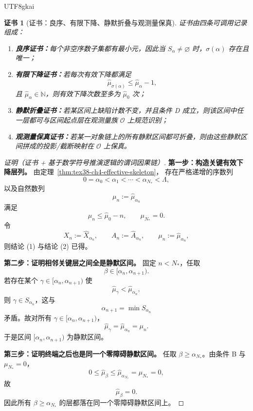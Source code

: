 \documentclass[12pt]{article}
\newtheorem{Certificate}{证书}[section]
\newcommand{\NN}{\mathbb{N}}
\begin{document}
\begin{CJK*}{UTF8}{gkai}
\begin{Certificate}[证书：良序、有限下降、静默折叠与观测量保真]
\label{cert:tex38-ch4-projection}
证书由四条可调用记录组成：
\begin{enumerate}
  \item \textbf{良序证书：}每个非空序数子集都有最小元，因此当 $S_\alpha\neq\varnothing$ 时，$\sigma(\alpha)$ 存在且唯一；
  \item \textbf{有限下降证书：}若每次有效下降都满足
  \[
    \widehat\mu_{\sigma(\alpha)}\le \widehat\mu_\alpha-1,
  \]
  且 $\widehat\mu_\alpha\in\NN$，则有效下降次数至多为 $\widehat\mu_0$ 次；
  \item \textbf{静默折叠证书：}若某区间上缺陷计数不变，并且条件 D 成立，则该区间中任一层都可与区间起点层在观测量族 $\mathcal O$ 上规范识别；
  \item \textbf{观测量保真证书：}若某一对象链上的所有静默区间都可折叠，则由这些静默区间拼成的投影/截断映射在 $\mathcal O$ 上保真。
\end{enumerate}
\end{Certificate}

\begin{proof}[证明（证书 + 基于数学符号推演逻辑的谓词因果链）]
\textbf{第一步：构造关键有效下降层列。}
由定理~\ref{thm:tex38-ch4-effective-skeleton}，
存在严格递增的序数列
\[
  0=\alpha_0<\alpha_1<\cdots<\alpha_{N_\ast}<\Lambda,
\]
以及自然数列
\[
  \mu_n:=\widehat\mu_{\alpha_n}
\]
满足
\[
  \mu_n\le \widehat\mu_0-n,
  \qquad
  \mu_{N_\ast}=0.
\]
令
\[
  X_n:=\widehat X_{\alpha_n},
  \qquad
  A_n:=\widehat A_{\alpha_n},
  \qquad
  \mu_n:=\widehat\mu_{\alpha_n},
\]
则结论 (1) 与结论 (2) 已得。

\textbf{第二步：证明相邻关键层之间全是静默区间。}
固定 $n<N_\ast$，任取
\[
  \beta\in[\alpha_n,\alpha_{n+1}).
\]
若存在某个 $\gamma\in[\alpha_n,\alpha_{n+1})$ 使
\[
  \widehat\mu_\gamma<\widehat\mu_{\alpha_n},
\]
则 $\gamma\in S_{\alpha_n}$，这与
\[
  \alpha_{n+1}=\min S_{\alpha_n}
\]
矛盾。故对所有 $\gamma\in[\alpha_n,\alpha_{n+1})$，
\[
  \widehat\mu_\gamma=\widehat\mu_{\alpha_n}=\mu_n.
\]
于是区间 $[\alpha_n,\alpha_{n+1})$ 为静默区间。

\textbf{第三步：证明终端之后也是同一个零障碍静默区间。}
任取 $\beta\ge \alpha_{N_\ast}$。由条件 B 与 $\mu_{N_\ast}=0$，
\[
  0\le \widehat\mu_\beta\le \widehat\mu_{\alpha_{N_\ast}}=\mu_{N_\ast}=0,
\]
故
\[
  \widehat\mu_\beta=0.
\]
因此所有 $\beta\ge\alpha_{N_\ast}$ 的层都落在同一个零障碍静默区间上。


\end{proof}
\end{CJK*}
\end{document}
